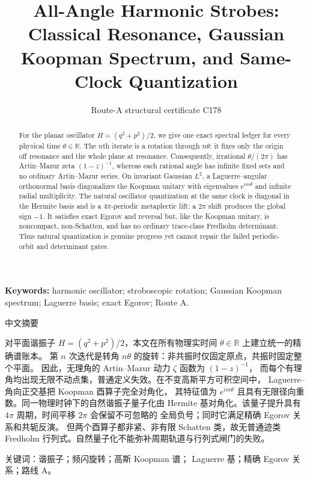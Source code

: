 \documentclass[10pt]{article}
\title{\vspace{-1.5em}All-Angle Harmonic Strobes: Classical Resonance, Gaussian Koopman Spectrum, and Same-Clock Quantization}
\author{Route-A structural certificate C178}
\date{}
\begin{document}
\maketitle
\begin{abstract}
For the planar oscillator $H=(q^2+p^2)/2$, we give one exact spectral
ledger for every physical time $\theta\in\mathbb R$.  The $n$th iterate is a
rotation through $n\theta$: it fixes only the origin off resonance and the
whole plane at resonance.  Consequently, irrational $\theta/(2\pi)$ has
Artin--Mazur zeta $(1-z)^{-1}$, whereas each rational angle has infinite
fixed sets and no ordinary Artin--Mazur series.  On invariant Gaussian
$L^2$, a Laguerre--angular orthonormal basis diagonalizes the Koopman unitary
with eigenvalues $e^{im\theta}$ and infinite radial multiplicity.  The
natural oscillator quantization at the same clock is diagonal in the
Hermite basis and is a $4\pi$-periodic metaplectic lift: a $2\pi$ shift
produces the global sign $-1$.  It satisfies exact Egorov and reversal but, like
the Koopman unitary, is noncompact, non-Schatten, and has no ordinary
trace-class Fredholm determinant.  Thus natural quantization is genuine
progress yet cannot repair the failed periodic-orbit and determinant gates.
\end{abstract}
\noindent\textbf{Keywords:} harmonic oscillator; stroboscopic rotation;
Gaussian Koopman spectrum; Laguerre basis; exact Egorov; Route A.

\begin{otherlanguage}{chinese-simplified}
\begin{center}{\large 中文摘要}\end{center}
对平面谐振子 $H=(q^2+p^2)/2$，本文在所有物理实时间 $\theta\in\mathbb R$ 上建立统一的精确谱账本。
第 $n$ 次迭代是转角 $n\theta$ 的旋转：非共振时仅固定原点，共振时固定整个平面。
因此，无理角的 \foreignlanguage{english}{Artin--Mazur} 动力 $\zeta$ 函数为 $(1-z)^{-1}$，
而每个有理角均出现无限不动点集，普通定义失效。在不变高斯平方可积空间中，
\foreignlanguage{english}{Laguerre--}角向正交基把 \foreignlanguage{english}{Koopman} 酉算子完全对角化，
其特征值为 $e^{im\theta}$ 且具有无限径向重数。同一物理时钟下的自然谐振子量子化由
\foreignlanguage{english}{Hermite} 基对角化。该量子提升具有 $4\pi$ 周期，时间平移 $2\pi$ 会保留不可忽略的
全局负号；同时它满足精确 \foreignlanguage{english}{Egorov} 关系和共轭反演。
但两个酉算子都非紧、非有限 \foreignlanguage{english}{Schatten} 类，故无普通迹类
\foreignlanguage{english}{Fredholm} 行列式。自然量子化不能弥补周期轨道与行列式闸门的失败。

\noindent 关键词：谐振子；频闪旋转；高斯 \foreignlanguage{english}{Koopman} 谱；
\foreignlanguage{english}{Laguerre} 基；精确 \foreignlanguage{english}{Egorov} 关系；路线 \foreignlanguage{english}{A}。
\end{otherlanguage}
\end{document}
